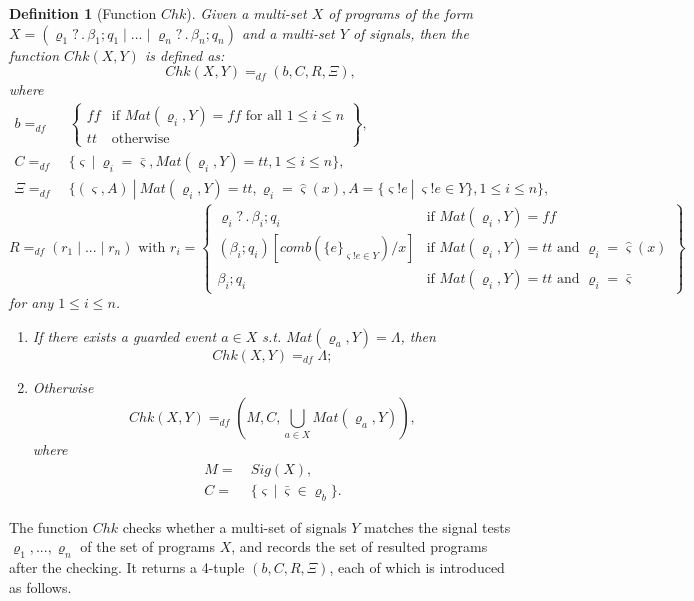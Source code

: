 \documentclass{fcs}
\newtheorem{mydef}{Definition}[section]
\newcommand{\sig}[0]{\varsigma}
\newcommand{\true}[0]{\mathit{tt}}
\newcommand{\false}[0]{\mathit{ff}}
\DeclareMathOperator{\seq}{;}
\newcommand{\none}[0]{\Lambda}
\newcommand{\Chk}[0]{\mathit{Chk}}
\newcommand{\Match}[0]{\mathit{Mat}}
\newcommand{\Signal}[0]{\mathit{Sig}}
\DeclareMathOperator{\sep}{|}
\DeclareMathOperator{\nex}{.}
\newcommand{\comb}[0]{\mathit{comb}}
\newcommand{\SV}[0]{\Xi}
\newcommand{\dddef}[0]{=_{df}}
\begin{document}
\begin{mydef}[Function $\Chk$]
	\label{def:Function Chk}
	Given a multi-set $X$ of programs of the form $X = (\varrho_1?\nex \beta_1\seq q_1\sep ...\sep \varrho_n?\nex \beta_n\seq q_n)$ and a multi-set $Y$ of signals,
    then the function $\Chk(X, Y)$ is defined as:
	$$\Chk(X, Y)\dddef (b, C, R, \SV), $$
	where
    $$
    \begin{aligned}
    b\dddef&\  \left\{
        \begin{array}{ll}
            \false & \mbox{if $\Match(\varrho_i, Y)=\false$ for all $1\le i\le n$}\\
            \true & \mbox{otherwise}
        \end{array}
    \right\},
    \\
	C\dddef&\ \{\sig\ |\ \varrho_i = \bar{\sig}, \Match(\varrho_i, Y) = \true, 1\le i\le n\},
	\\
    \SV \dddef&\ \{(\sig, A)\ |\ \Match(\varrho_i, Y)=\true, \varrho_i = \hat{\sig}(x), A = \{\sig!e\ |\ \sig!e\in Y\}, 1\le i\le n\},
    \end{aligned}
    $$
	$$
	R\dddef (r_1\sep...\sep r_n)\mbox{ with }r_i = \left\{\begin{array}{ll}
	    \varrho_i?\nex \beta_i\seq q_i &\mbox{if $\Match(\varrho_i, Y) = \false$}\\
	    (\beta_i\seq q_i)[\comb(\{e\}_{\sig!e\in Y})/x] &\mbox{if $\Match(\varrho_i, Y)=\true$ and $\varrho_i = \hat{\sig}(x)$}\\
	    \beta_i\seq q_i &\mbox{if $\Match(\varrho_i, Y)=\true$ and $\varrho_i = \bar{\sig}$}
	\end{array}\right\}
	$$
	for any $1\le i\le n$.
	\ifx
	\begin{enumerate}
		\item If there exists a guarded event $a\in X$ s.t. $\Match(\varrho_a, Y) = \none$, then
		$$\Chk(X, Y) \dddef \none;$$
		\item Otherwise %
		 $$\Chk(X, Y)\dddef (M, C, \bigcup_{a\in X}\Match(\varrho_a, Y)), $$
		 where
		 $$\begin{aligned}
		 M =&\ \Signal(X),\\
		 C =&\ \{\sig\ |\ \bar{\sig}\in \varrho_b\}.
		 \end{aligned}		
		 $$
		 \end{enumerate}
    \fi
		
\end{mydef}

The function $\Chk$ checks whether a multi-set of signals $Y$ matches the signal tests $\varrho_1,...,\varrho_n$ of the set of programs $X$,
and records the set of  resulted programs after the checking.
It returns a 4-tuple $(b, C, R, \SV)$, each of which is introduced as follows.
\end{document}
